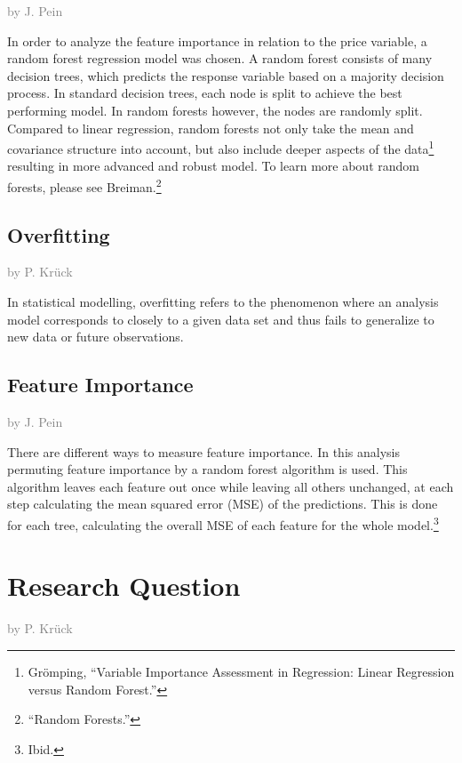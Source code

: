 \documentclass[a4paper, nobind]{templates/ociamthesis}
\begin{document}
\textcolor{gray}{by J. Pein}

In order to analyze the feature importance in relation to the price variable, a random forest regression model was chosen. A random forest consists of many decision trees, which predicts the response variable based on a majority decision process. In standard decision trees, each node is split to achieve the best performing model. In random forests however, the nodes are randomly split.
Compared to linear regression, random forests not only take the mean and covariance structure into account, but also include deeper aspects of the data\footnote{Grömping, ``Variable Importance Assessment in Regression: Linear Regression versus Random Forest.''} resulting in more advanced and robust model. To learn more about random forests, please see Breiman.\footnote{``Random Forests.''}

\hypertarget{overfitting}{%
\subsection{Overfitting}\label{overfitting}}

\textcolor{gray}{by P. Krück}

In statistical modelling, overfitting refers to the phenomenon where an analysis model corresponds to closely to a given data set and thus fails to generalize to new data or future observations.

\hypertarget{feature-importance}{%
\subsection{Feature Importance}\label{feature-importance}}

\textcolor{gray}{by J. Pein}

There are different ways to measure feature importance. In this analysis permuting feature importance by a random forest algorithm is used. This algorithm leaves each feature out once while leaving all others unchanged, at each step calculating the mean squared error (MSE) of the predictions. This is done for each tree, calculating the overall MSE of each feature for the whole model.\footnote{Ibid.}

\hypertarget{research-question}{%
\section{Research Question}\label{research-question}}

\textcolor{gray}{by P. Krück}
\end{document}
